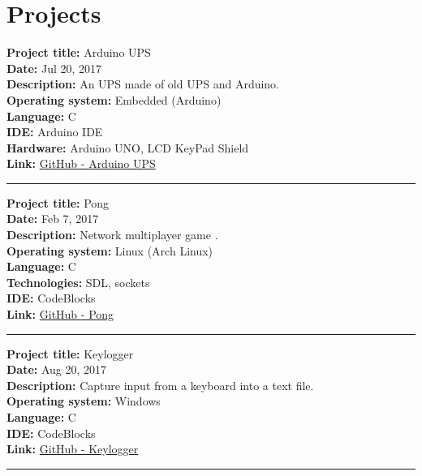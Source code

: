 \documentclass[slovak]{article}
\begin{document}
\section*{Projects}\label{projects}

\textbf{Project title:} Arduino UPS\\
\textbf{Date:} Jul 20, 2017\\
\textbf{Description:} An UPS made of old UPS and Arduino.\\
\textbf{Operating system:} Embedded (Arduino)\\
\textbf{Language:} C\\
\textbf{IDE:} Arduino IDE\\
\textbf{Hardware:} Arduino UNO, LCD KeyPad Shield\\
\textbf{Link:} \href{https://github.com/kyberdrb/Arduino\_UPS}{GitHub - Arduino UPS}

\begin{center}\rule{3in}{0.4pt}\end{center}

\noindent
\textbf{Project title:} Pong\\
\textbf{Date:} Feb 7, 2017\\
\textbf{Description:} Network multiplayer game .\\
\textbf{Operating system:} Linux (Arch Linux)\\
\textbf{Language:} C\\
\textbf{Technologies:} SDL, sockets\\
\textbf{IDE:} CodeBlocks\\
\textbf{Link:} \href{https://github.com/kyberdrb/semestralka\_vstavane\_systemy}{GitHub - Pong}

\begin{center}\rule{3in}{0.4pt}\end{center}

\noindent
\textbf{Project title:} Keylogger\\
\textbf{Date:} Aug 20, 2017\\
\textbf{Description:} Capture input from a keyboard into a text file.\\
\textbf{Operating system:} Windows\\
\textbf{Language:} C\\
\textbf{IDE:} CodeBlocks\\
\textbf{Link:} \href{https://github.com/kyberdrb/windows\_keylogger}{GitHub - Keylogger}

\begin{center}\rule{3in}{0.4pt}\end{center}
\end{document}
